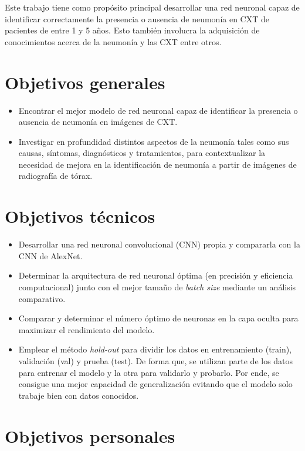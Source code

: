 
Este trabajo tiene como propósito principal desarrollar una red neuronal capaz de identificar correctamente la presencia o ausencia de neumonía en CXT de pacientes de entre 1 y 5 años. Esto también involucra la adquisición de conocimientos acerca de la neumonía y las CXT entre otros. 

\section{Objetivos generales}

\begin{itemize}
    \item Encontrar el mejor modelo de red neuronal capaz de identificar la presencia o ausencia de neumonía en imágenes de CXT.
    \item Investigar en profundidad distintos aspectos de la neumonía tales como sus causas, síntomas, diagnósticos y tratamientos, para contextualizar la necesidad de mejora en la identificación de neumonía a partir de imágenes de radiografía de tórax.
\end{itemize}

\section{Objetivos técnicos}

\begin{itemize}
    \item Desarrollar una red neuronal convolucional (CNN) propia y compararla con la CNN de AlexNet. 
    \item Determinar la arquitectura de red neuronal óptima (en precisión y eficiencia computacional) junto con el mejor tamaño de \textit{batch size} mediante un análisis comparativo. 
    \item Comparar y determinar el número óptimo de neuronas en la capa oculta para maximizar el rendimiento del modelo.
    \item Emplear el método \textit{hold-out} para dividir los datos en entrenamiento (train), validación (val) y prueba (test). De forma que, se utilizan parte de los datos para entrenar el modelo y la otra para validarlo y probarlo. Por ende, se consigue una mejor capacidad de generalización evitando que el modelo solo trabaje bien con datos conocidos.
\end{itemize}

\section{Objetivos personales}

